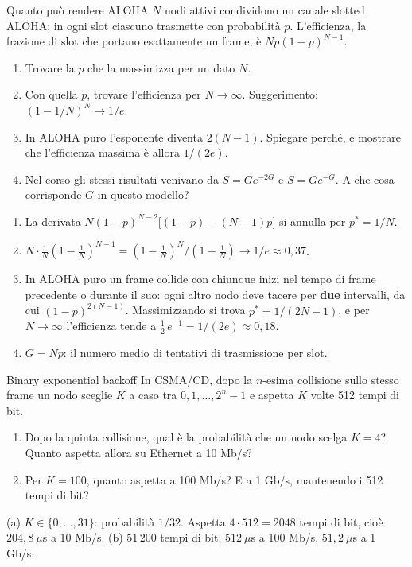 \begin{esercizio}{Quanto può rendere ALOHA}
$N$ nodi attivi condividono un canale slotted ALOHA; in ogni slot ciascuno trasmette con probabilità $p$. L'efficienza, la frazione di slot
che portano esattamente un frame, è $Np(1-p)^{N-1}$.
\begin{enumerate}[label=(\alph*)]
    \item Trovare la $p$ che la massimizza per un dato $N$.
    \item Con quella $p$, trovare l'efficienza per $N \to \infty$. Suggerimento: $(1 - 1/N)^N \to 1/e$.
    \item In ALOHA puro l'esponente diventa $2(N-1)$. Spiegare perché, e mostrare che l'efficienza massima è allora $1/(2e)$.
    \item Nel corso gli stessi risultati venivano da $S = Ge^{-2G}$ e $S = Ge^{-G}$. A che cosa corrisponde $G$ in questo modello?
\end{enumerate}

\svolgimento
\begin{enumerate}[label=(\alph*)]
    \item La derivata $N(1-p)^{N-2}\bigl[(1-p) - (N-1)p\bigr]$ si annulla per $p^* = 1/N$.
    \item $N \cdot \frac{1}{N}(1 - \frac{1}{N})^{N-1} = (1 - \frac{1}{N})^{N} / (1 - \frac{1}{N}) \to 1/e \approx 0{,}37$.
    \item In ALOHA puro un frame collide con chiunque inizi nel tempo di frame precedente o durante il suo: ogni altro nodo deve tacere per
          \textbf{due} intervalli, da cui $(1-p)^{2(N-1)}$. Massimizzando si trova $p^* = 1/(2N-1)$, e per $N \to \infty$ l'efficienza tende a
          $\frac{1}{2}\, e^{-1} = 1/(2e) \approx 0{,}18$.
    \item $G = Np$: il numero medio di tentativi di trasmissione per slot.
\end{enumerate}
\end{esercizio}

\begin{esercizio}{Binary exponential backoff}
In CSMA/CD, dopo la $n$-esima collisione sullo stesso frame un nodo sceglie $K$ a caso tra $0, 1, \dots, 2^n - 1$ e aspetta $K$ volte 512
tempi di bit.
\begin{enumerate}[label=(\alph*)]
    \item Dopo la quinta collisione, qual è la probabilità che un nodo scelga $K = 4$? Quanto aspetta allora su Ethernet a 10 Mb/s?
    \item Per $K = 100$, quanto aspetta a 100 Mb/s? E a 1 Gb/s, mantenendo i 512 tempi di bit?
\end{enumerate}

\svolgimento
(a) $K \in \{0, \dots, 31\}$: probabilità $1/32$. Aspetta $4 \cdot 512 = 2048$ tempi di bit, cioè $204{,}8\ \mu$s a 10 Mb/s. (b) $51\,200$
tempi di bit: $512\ \mu$s a 100 Mb/s, $51{,}2\ \mu$s a 1 Gb/s.
\end{esercizio}

